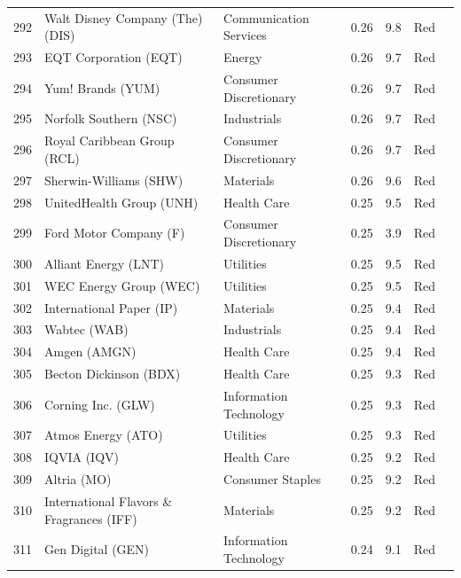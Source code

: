 \documentclass[11pt,a4paper]{article}
\begin{document}
{\begin{longtable}{r p{4.4cm} p{2.8cm} r r l l}
292 & Walt Disney Company (The) (DIS) & Communication Services & 0.26 & 9.8 & \cellcolor[HTML]{F4B6B6}Red &  \\
293 & EQT Corporation (EQT) & Energy & 0.26 & 9.7 & \cellcolor[HTML]{F4B6B6}Red &  \\
294 & Yum! Brands (YUM) & Consumer Discretionary & 0.26 & 9.7 & \cellcolor[HTML]{F4B6B6}Red &  \\
295 & Norfolk Southern (NSC) & Industrials & 0.26 & 9.7 & \cellcolor[HTML]{F4B6B6}Red &  \\
296 & Royal Caribbean Group (RCL) & Consumer Discretionary & 0.26 & 9.7 & \cellcolor[HTML]{F4B6B6}Red &  \\
297 & Sherwin-Williams (SHW) & Materials & 0.26 & 9.6 & \cellcolor[HTML]{F4B6B6}Red &  \\
298 & UnitedHealth Group (UNH) & Health Care & 0.25 & 9.5 & \cellcolor[HTML]{F4B6B6}Red &  \\
299 & Ford Motor Company (F) & Consumer Discretionary & 0.25 & 3.9 & \cellcolor[HTML]{F4B6B6}Red &  \\
300 & Alliant Energy (LNT) & Utilities & 0.25 & 9.5 & \cellcolor[HTML]{F4B6B6}Red &  \\
301 & WEC Energy Group (WEC) & Utilities & 0.25 & 9.5 & \cellcolor[HTML]{F4B6B6}Red &  \\
302 & International Paper (IP) & Materials & 0.25 & 9.4 & \cellcolor[HTML]{F4B6B6}Red &  \\
303 & Wabtec (WAB) & Industrials & 0.25 & 9.4 & \cellcolor[HTML]{F4B6B6}Red &  \\
304 & Amgen (AMGN) & Health Care & 0.25 & 9.4 & \cellcolor[HTML]{F4B6B6}Red &  \\
305 & Becton Dickinson (BDX) & Health Care & 0.25 & 9.3 & \cellcolor[HTML]{F4B6B6}Red &  \\
306 & Corning Inc. (GLW) & Information Technology & 0.25 & 9.3 & \cellcolor[HTML]{F4B6B6}Red &  \\
307 & Atmos Energy (ATO) & Utilities & 0.25 & 9.3 & \cellcolor[HTML]{F4B6B6}Red &  \\
308 & IQVIA (IQV) & Health Care & 0.25 & 9.2 & \cellcolor[HTML]{F4B6B6}Red &  \\
309 & Altria (MO) & Consumer Staples & 0.25 & 9.2 & \cellcolor[HTML]{F4B6B6}Red &  \\
310 & International Flavors \& Fragrances (IFF) & Materials & 0.25 & 9.2 & \cellcolor[HTML]{F4B6B6}Red &  \\
311 & Gen Digital (GEN) & Information Technology & 0.24 & 9.1 & \cellcolor[HTML]{F4B6B6}Red &  \\

\end{longtable}}
\end{document}
